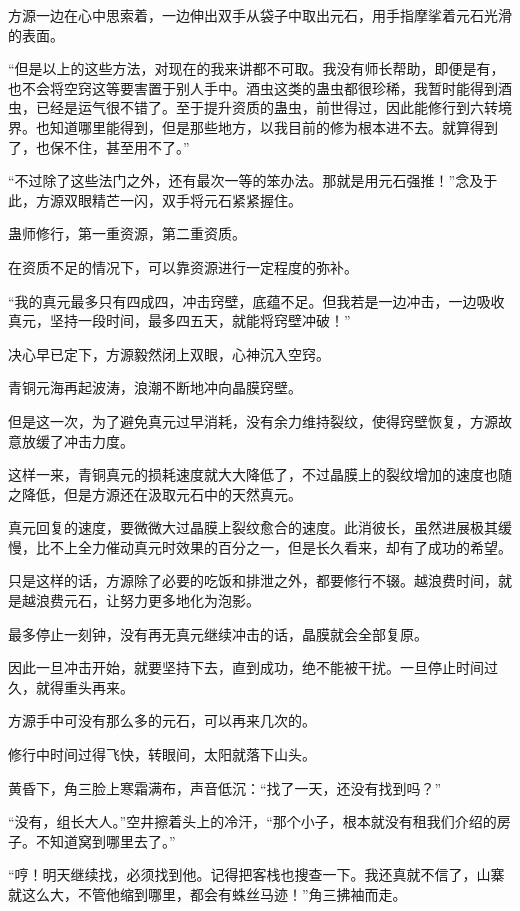 \begin{this_body}
方源一边在心中思索着，一边伸出双手从袋子中取出元石，用手指摩挲着元石光滑的表面。

“但是以上的这些方法，对现在的我来讲都不可取。我没有师长帮助，即便是有，也不会将空窍这等要害置于别人手中。酒虫这类的蛊虫都很珍稀，我暂时能得到酒虫，已经是运气很不错了。至于提升资质的蛊虫，前世得过，因此能修行到六转境界。也知道哪里能得到，但是那些地方，以我目前的修为根本进不去。就算得到了，也保不住，甚至用不了。”

“不过除了这些法门之外，还有最次一等的笨办法。那就是用元石强推！”念及于此，方源双眼精芒一闪，双手将元石紧紧握住。

蛊师修行，第一重资源，第二重资质。

在资质不足的情况下，可以靠资源进行一定程度的弥补。

“我的真元最多只有四成四，冲击窍壁，底蕴不足。但我若是一边冲击，一边吸收真元，坚持一段时间，最多四五天，就能将窍壁冲破！”

决心早已定下，方源毅然闭上双眼，心神沉入空窍。

青铜元海再起波涛，浪潮不断地冲向晶膜窍壁。

但是这一次，为了避免真元过早消耗，没有余力维持裂纹，使得窍壁恢复，方源故意放缓了冲击力度。

这样一来，青铜真元的损耗速度就大大降低了，不过晶膜上的裂纹增加的速度也随之降低，但是方源还在汲取元石中的天然真元。

真元回复的速度，要微微大过晶膜上裂纹愈合的速度。此消彼长，虽然进展极其缓慢，比不上全力催动真元时效果的百分之一，但是长久看来，却有了成功的希望。

只是这样的话，方源除了必要的吃饭和排泄之外，都要修行不辍。越浪费时间，就是越浪费元石，让努力更多地化为泡影。

最多停止一刻钟，没有再无真元继续冲击的话，晶膜就会全部复原。

因此一旦冲击开始，就要坚持下去，直到成功，绝不能被干扰。一旦停止时间过久，就得重头再来。

方源手中可没有那么多的元石，可以再来几次的。

修行中时间过得飞快，转眼间，太阳就落下山头。

黄昏下，角三脸上寒霜满布，声音低沉：“找了一天，还没有找到吗？”

“没有，组长大人。”空井擦着头上的冷汗，“那个小子，根本就没有租我们介绍的房子。不知道窝到哪里去了。”

“哼！明天继续找，必须找到他。记得把客栈也搜查一下。我还真就不信了，山寨就这么大，不管他缩到哪里，都会有蛛丝马迹！”角三拂袖而走。


\end{this_body}

